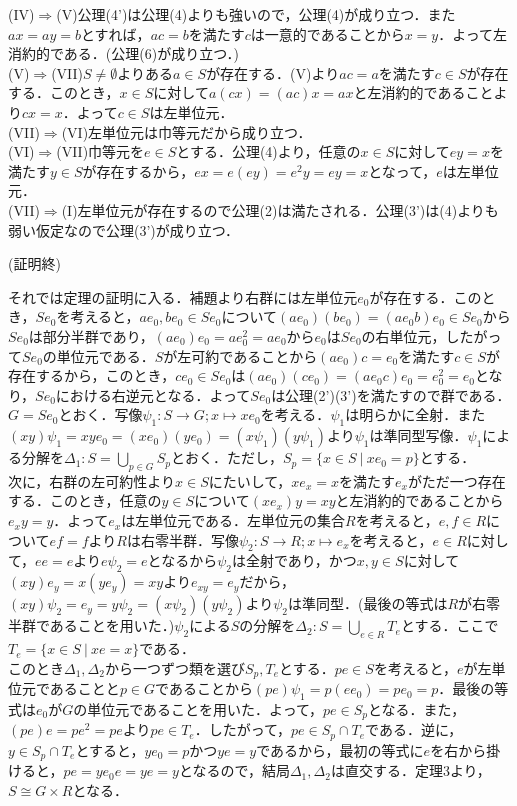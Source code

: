 (IV)$\Rightarrow$(V)公理(4')は公理(4)よりも強いので，公理(4)が成り立つ．また$ax=ay=b$とすれば，$ac=b$を満たす$c$は一意的であることから$x=y$．よって左消約的である．(公理(6)が成り立つ．)\\
(V)$\Rightarrow$(VII)$S\neq\emptyset$よりある$a\in S$が存在する．(V)より$ac=a$を満たす$c\in S$が存在する．このとき，$x\in S$に対して$a(cx)=(ac)x=ax$と左消約的であることより$cx=x$．よって$c\in S$は左単位元．\\
(VII)$\Rightarrow$(VI)左単位元は巾等元だから成り立つ．\\
(VI)$\Rightarrow$(VII)巾等元を$e\in S$とする．公理(4)より，任意の$x\in S$に対して$ey=x$を満たす$y\in S$が存在するから，$ex=e(ey)=e^2y=ey=x$となって，$e$は左単位元．\\
(VII)$\Rightarrow$(I)左単位元が存在するので公理(2)は満たされる．公理(3')は(4)よりも弱い仮定なので公理(3')が成り立つ．
\begin{flushright}
(証明終)
\end{flushright}
それでは定理の証明に入る．補題より右群には左単位元$e_0$が存在する．このとき，$Se_0$を考えると，$ae_0,be_0\in Se_0$について$(ae_0)(be_0)=(ae_0b)e_0\in Se_0$から$Se_0$は部分半群であり，$(ae_0)e_0=ae_0^2=ae_0$から$e_0$は$Se_0$の右単位元，したがって$Se_0$の単位元である．$S$が左可約であることから$(ae_0)c=e_0$を満たす$c\in S$が存在するから，このとき，$ce_0\in Se_0$は$(ae_0)(ce_0)=(ae_0c)e_0=e_0^2=e_0$となり，$Se_0$における右逆元となる．よって$Se_0$は公理(2')(3')を満たすので群である．$G=Se_0$とおく．写像$\psi_1:S\rightarrow G;x\mapsto xe_0$を考える．$\psi_1$は明らかに全射．また$(xy)\psi_1=xye_0=(xe_0)(ye_0)=(x\psi_1)(y\psi_1)$より$\psi_1$は準同型写像．$\psi_1$による分解を$\Delta_1:S=\displaystyle\bigcup_{p\in G}S_p$とおく．ただし，$S_p=\{x\in S\:|\:xe_0=p\}$とする．\\
次に，右群の左可約性より$x\in S$にたいして，$xe_x=x$を満たす$e_x$がただ一つ存在する．このとき，任意の$y\in S$について$(xe_x)y=xy$と左消約的であることから$e_xy=y$．よって$e_x$は左単位元である．左単位元の集合$R$を考えると，$e,f\in R$について$ef=f$より$R$は右零半群．写像$\psi_2:S\rightarrow R;x\mapsto e_x$を考えると，$e\in R$に対して，$ee=e$より$e\psi_2=e$となるから$\psi_2$は全射であり，かつ$x,y\in S$に対して$(xy)e_y=x(ye_y)=xy$より$e_{xy}=e_{y}$だから，$(xy)\psi_2=e_y=y\psi_2=(x\psi_2)(y\psi_2)$より$\psi_2$は準同型．(最後の等式は$R$が右零半群であることを用いた．)$\psi_2$による$S$の分解を$\Delta_2:S=\displaystyle\bigcup_{e\in R}T_e$とする．ここで$T_e=\{x\in S\:|\:xe=x\}$である．\\
このとき$\Delta_1,\Delta_2$から一つずつ類を選び$S_p,T_e$とする．$pe\in S$を考えると，$e$が左単位元であることと$p\in G$であることから$(pe)\psi_1=p(ee_0)=pe_0=p$．最後の等式は$e_0$が$G$の単位元であることを用いた．よって，$pe\in S_p$となる．また，$(pe)e=pe^2=pe$より$pe\in T_e$．したがって，$pe\in S_p\cap T_e$である．逆に，$y\in S_p\cap T_e$とすると，$ye_0=p$かつ$ye=y$であるから，最初の等式に$e$を右から掛けると，$pe=ye_0e=ye=y$となるので，結局$\Delta_1,\Delta_2$は直交する．定理3より，$S\cong G\times R$となる．
